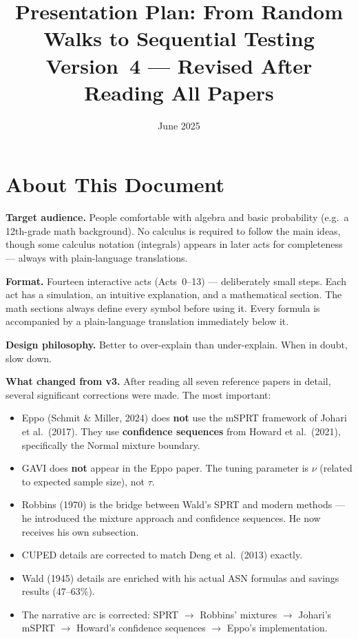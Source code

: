 \documentclass[12pt, a4paper]{article}
\title{\textbf{Presentation Plan: From Random Walks to Sequential Testing}\\[6pt]
       \large Version~4 --- Revised After Reading All Papers}
\author{}
\date{June 2025}
\begin{document}
\maketitle
\tableofcontents
\newpage

\section*{About This Document}

\textbf{Target audience.}
People comfortable with algebra and basic probability (e.g.\ a 12th-grade
math background).  No calculus is required to follow the main ideas, though
some calculus notation (integrals) appears in later acts for completeness ---
always with plain-language translations.

\textbf{Format.}
Fourteen interactive acts (Acts~0--13) --- deliberately small steps.  Each act
has a simulation, an intuitive explanation, and a mathematical section.  The
math sections always define every symbol before using it.  Every formula is
accompanied by a plain-language translation immediately below it.

\textbf{Design philosophy.}
Better to over-explain than under-explain.  When in doubt, slow down.

\textbf{What changed from v3.}
After reading all seven reference papers in detail, several significant
corrections were made.  The most important:
\begin{itemize}[nosep]
  \item Eppo (Schmit \& Miller, 2024) does \textbf{not} use the mSPRT
        framework of Johari et al.\ (2017).  They use \textbf{confidence
        sequences} from Howard et al.\ (2021), specifically the Normal
        mixture boundary.
  \item GAVI does \textbf{not} appear in the Eppo paper.  The tuning
        parameter is $\nu$ (related to expected sample size), not $\tau$.
  \item Robbins (1970) is the bridge between Wald's SPRT and modern
        methods --- he introduced the mixture approach and confidence
        sequences.  He now receives his own subsection.
  \item CUPED details are corrected to match Deng et al.\ (2013) exactly.
  \item Wald (1945) details are enriched with his actual ASN formulas
        and savings results (47--63\%).
  \item The narrative arc is corrected: SPRT $\to$ Robbins' mixtures $\to$
        Johari's mSPRT $\to$ Howard's confidence sequences $\to$ Eppo's
        implementation.
\end{itemize}
\end{document}
